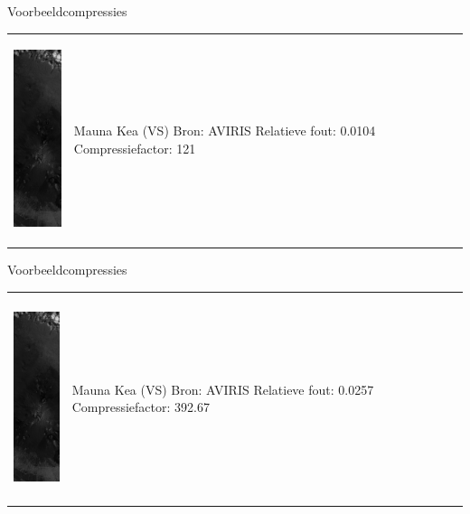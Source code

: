 \documentclass[t,12pt,dutch
\ifx\beamermode\undefined\else,\beamermode\fi
]{beamer}
\begin{document}
\begin{frame}{Voorbeeldcompressies}

\begin{table}[H]
\centering
\begin{tabular}{C{0.6\textwidth}  L{0.4\textwidth}}
\includegraphics[height=6cm]{images/example_compression_Mauna_Kea_0_01.png}
&
Mauna Kea (VS)\newline
Bron: AVIRIS\newline
\vspace{5mm}
Relatieve fout: 0.0104
Compressiefactor: 121
\end{tabular}
\end{table}

\end{frame}

\begin{frame}{Voorbeeldcompressies}

\begin{table}[H]
\centering
\begin{tabular}{C{0.6\textwidth}  L{0.4\textwidth}}
\includegraphics[height=6cm]{images/example_compression_Mauna_Kea_0_025.png}
&
Mauna Kea (VS)\newline
Bron: AVIRIS\newline
\vspace{5mm}
Relatieve fout: 0.0257
Compressiefactor: 392.67
\end{tabular}
\end{table}

\end{frame}
\end{document}
